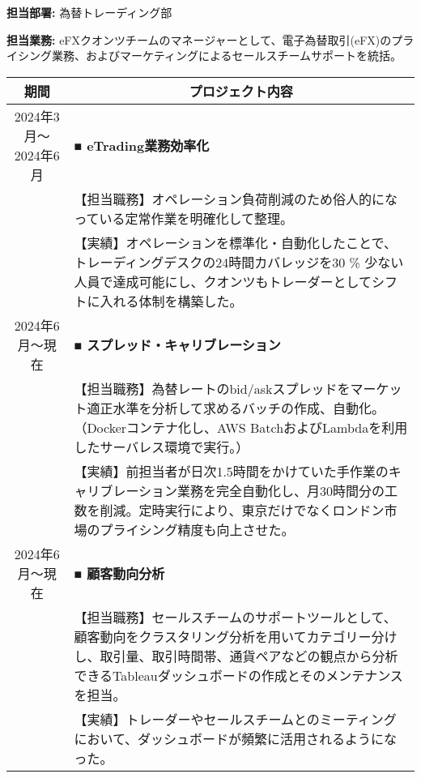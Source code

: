 \documentclass[uplatex,a4j,10.5pt,dvipdfmx]{jsarticle}
\begin{document}
\noindent\textbf{担当部署:} 為替トレーディング部

\noindent\textbf{担当業務:} eFXクオンツチームのマネージャーとして、電子為替取引(eFX)のプライシング業務、およびマーケティングによるセールスチームサポートを統括。

\begin{longtable}{|c|p{14cm}|}
	\hline
	\multicolumn{1}{|c|}{\textbf{期間}} & \multicolumn{1}{c|}{\textbf{プロジェクト内容}}                                                                       \\
	\hline
	\endhead

	\hline
	2024年3月～2024年6月                   & \textbf{■ eTrading業務効率化}                                                                                     \\
	                                  & 【担当職務】オペレーション負荷削減のため俗人的になっている定常作業を明確化して整理。                                                                   \\
	                                  & 【実績】オペレーションを標準化・自動化したことで、トレーディングデスクの24時間カバレッジを30 \% 少ない人員で達成可能にし、クオンツもトレーダーとしてシフトに入れる体制を構築した。                \\
	\hline
	2024年6月～現在                        & \textbf{■ スプレッド・キャリブレーション}                                                                                   \\
	                                  & 【担当職務】為替レートのbid/askスプレッドをマーケット適正水準を分析して求めるバッチの作成、自動化。（Dockerコンテナ化し、AWS BatchおよびLambdaを利用したサーバレス環境で実行。）       \\
	                                  & 【実績】前担当者が日次1.5時間をかけていた手作業のキャリブレーション業務を完全自動化し、月30時間分の工数を削減。定時実行により、東京だけでなくロンドン市場のプライシング精度も向上させた。              \\
	\hline
	2024年6月～現在                        & \textbf{■ 顧客動向分析}                                                                                            \\
	                                  & 【担当職務】セールスチームのサポートツールとして、顧客動向をクラスタリング分析を用いてカテゴリー分けし、取引量、取引時間帯、通貨ペアなどの観点から分析できるTableauダッシュボードの作成とそのメンテナンスを担当。 \\
	                                  & 【実績】トレーダーやセールスチームとのミーティングにおいて、ダッシュボードが頻繁に活用されるようになった。                                                        \\

\end{longtable}
\end{document}
